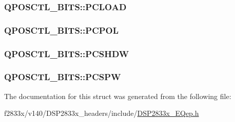 \subsubsection[{P\+C\+L\+O\+A\+D}]{ Q\+P\+O\+S\+C\+T\+L\+\_\+\+B\+I\+T\+S\+::\+P\+C\+L\+O\+A\+D}\label{struct_q_p_o_s_c_t_l___b_i_t_s_a25257724e310db61a8a086a6e47186a2}
\hypertarget{struct_q_p_o_s_c_t_l___b_i_t_s_ae42571e0b4c0a85f8edd03dd42f7b74c}{}
\subsubsection[{P\+C\+P\+O\+L}]{ Q\+P\+O\+S\+C\+T\+L\+\_\+\+B\+I\+T\+S\+::\+P\+C\+P\+O\+L}\label{struct_q_p_o_s_c_t_l___b_i_t_s_ae42571e0b4c0a85f8edd03dd42f7b74c}
\hypertarget{struct_q_p_o_s_c_t_l___b_i_t_s_ad926082d34bc3065f9f344336b1c8084}{}
\subsubsection[{P\+C\+S\+H\+D\+W}]{ Q\+P\+O\+S\+C\+T\+L\+\_\+\+B\+I\+T\+S\+::\+P\+C\+S\+H\+D\+W}\label{struct_q_p_o_s_c_t_l___b_i_t_s_ad926082d34bc3065f9f344336b1c8084}
\hypertarget{struct_q_p_o_s_c_t_l___b_i_t_s_ac4eb2edac6f95bb0f9229d6b5929749f}{}
\subsubsection[{P\+C\+S\+P\+W}]{ Q\+P\+O\+S\+C\+T\+L\+\_\+\+B\+I\+T\+S\+::\+P\+C\+S\+P\+W}\label{struct_q_p_o_s_c_t_l___b_i_t_s_ac4eb2edac6f95bb0f9229d6b5929749f}


The documentation for this struct was generated from the following file\+:\begin{DoxyCompactItemize}
\item 
f2833x/v140/\+D\+S\+P2833x\+\_\+headers/include/\hyperlink{_d_s_p2833x___e_qep_8h}{D\+S\+P2833x\+\_\+\+E\+Qep.\+h}\end{DoxyCompactItemize}
